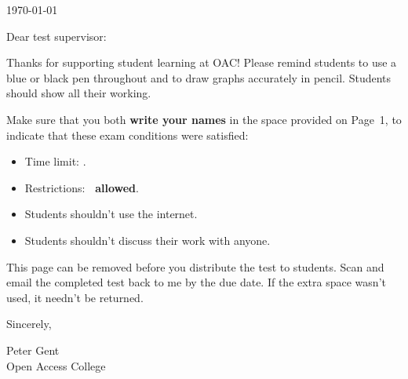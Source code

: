 \begin{coverpages}

\noindent \today

\vspace{.375in}

\noindent Dear test supervisor:

\vspace{.125in}

\noindent Thanks for supporting student learning at OAC! Please remind students to use a blue or black pen throughout and to draw graphs accurately in pencil. Students should show all their working.

\vspace{.125in}

\noindent Make sure that you both \textbf{write your names} in the space provided on Page~1, to indicate that these exam conditions were satisfied:
\begin{itemize}
    \item Time limit: \textbf{\MakeLowercase \timelimit}.
    \item Restrictions: \textbf{\MakeLowercase \conditions\ allowed}.
	\item Students shouldn't use the internet.
	\item Students shouldn't discuss their work with anyone.
\end{itemize}

\vspace{.125in}

\noindent This page can be removed before you distribute the test to students. Scan and email the completed test back to me by the due date. If the extra space wasn't used, it needn't be returned.

\vspace{.125in}

\noindent Sincerely,

\vspace{.75in}

\noindent Peter Gent \\
Open Access College

\end{coverpages}

